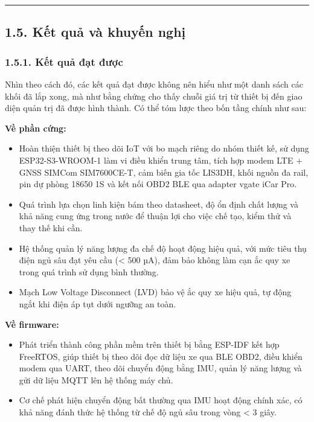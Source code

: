 \documentclass[a4paper]{extarticle}
\providecommand{\tightlist}{%
  \setlength{\itemsep}{0pt}\setlength{\parskip}{0pt}}
\begin{document}
\begin{center}\rule{0.5\linewidth}{0.5pt}\end{center}

\subsection{1.5. Kết quả và khuyến
nghị}\label{15-kux1ebft-quux1ea3-vuxe0-khuyux1ebfn-nghux1ecb}

\subsubsection{1.5.1. Kết quả đạt
được}\label{151-kux1ebft-quux1ea3-ux111ux1ea1t-ux111ux1b0ux1ee3c}

Nhìn theo cách đó, các kết quả đạt được không nên hiểu như một danh sách
các khối đã lắp xong, mà như bằng chứng cho thấy chuỗi giá trị từ thiết
bị đến giao diện quản trị đã được hình thành. Có thể tóm lược theo bốn tầng chính
như sau:

\textbf{Về phần cứng:}

\begin{itemize}
\tightlist
\item
  Hoàn thiện thiết bị theo dõi IoT với bo mạch riêng do nhóm thiết kế, sử
  dụng ESP32-S3-WROOM-1 làm vi điều khiển trung tâm, tích hợp modem LTE
  + GNSS SIMCom SIM7600CE-T, cảm biến gia tốc LIS3DH, khối nguồn đa
  rail, pin dự phòng 18650 1S và kết nối OBD2 BLE qua adapter vgate iCar
  Pro.
\item
  Quá trình lựa chọn linh kiện bám theo datasheet, độ ổn định chất lượng
  và khả năng cung ứng trong nước để thuận lợi cho việc chế tạo, kiểm
  thử và thay thế khi cần.
\item
  Hệ thống quản lý năng lượng đa chế độ hoạt động hiệu quả, với mức tiêu
  thụ điện ngủ sâu đạt yêu cầu (\textless{} 500 µA), đảm bảo không làm
  cạn ắc quy xe trong quá trình sử dụng bình thường.
\item
  Mạch Low Voltage Disconnect (LVD) bảo vệ ắc quy xe hiệu quả, tự động
  ngắt khi điện áp tụt dưới ngưỡng an toàn.
\end{itemize}

\textbf{Về firmware:}

\begin{itemize}
\tightlist
\item
  Phát triển thành công phần mềm trên thiết bị bằng ESP-IDF kết hợp
  FreeRTOS, giúp thiết bị theo dõi đọc dữ liệu xe qua BLE OBD2, điều khiển modem
  qua UART, theo dõi chuyển động bằng IMU, quản lý năng lượng và gửi dữ
  liệu MQTT lên hệ thống máy chủ.
\item
  Cơ chế phát hiện chuyển động bất thường qua IMU hoạt động chính xác,
  có khả năng đánh thức hệ thống từ chế độ ngủ sâu trong vòng
  \textless{} 3 giây.
\end{itemize}
\end{document}
